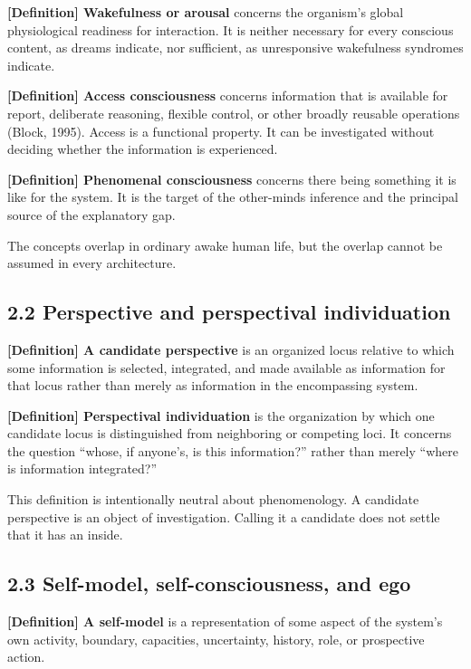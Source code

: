 \documentclass[
  11pt,
]{article}
\begin{document}
\textbf{{[}Definition{]} Wakefulness or arousal} concerns the organism's
global physiological readiness for interaction. It is neither necessary
for every conscious content, as dreams indicate, nor sufficient, as
unresponsive wakefulness syndromes indicate.

\textbf{{[}Definition{]} Access consciousness} concerns information that
is available for report, deliberate reasoning, flexible control, or
other broadly reusable operations (Block, 1995). Access is a functional
property. It can be investigated without deciding whether the
information is experienced.

\textbf{{[}Definition{]} Phenomenal consciousness} concerns there being
something it is like for the system. It is the target of the other-minds
inference and the principal source of the explanatory gap.

The concepts overlap in ordinary awake human life, but the overlap
cannot be assumed in every architecture.

\subsection{2.2 Perspective and perspectival
individuation}\label{perspective-and-perspectival-individuation}

\textbf{{[}Definition{]} A candidate perspective} is an organized locus
relative to which some information is selected, integrated, and made
available as information for that locus rather than merely as
information in the encompassing system.

\textbf{{[}Definition{]} Perspectival individuation} is the organization
by which one candidate locus is distinguished from neighboring or
competing loci. It concerns the question ``whose, if anyone's, is this
information?'' rather than merely ``where is information integrated?''

This definition is intentionally neutral about phenomenology. A
candidate perspective is an object of investigation. Calling it a
candidate does not settle that it has an inside.

\subsection{2.3 Self-model, self-consciousness, and
ego}\label{self-model-self-consciousness-and-ego}

\textbf{{[}Definition{]} A self-model} is a representation of some
aspect of the system's own activity, boundary, capacities, uncertainty,
history, role, or prospective action.
\end{document}
